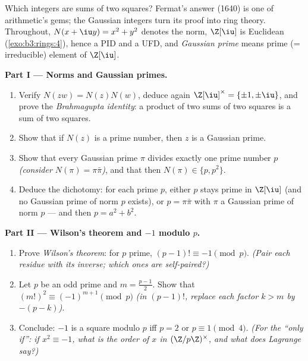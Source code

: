 \begin{problem}\label{pb:b3:rings:1}
Which integers are sums of two squares? Fermat's answer (1640) is
one of arithmetic's gems; the Gaussian integers turn its proof
into ring theory. Throughout, $N(x + \iu y) = x^2 + y^2$ denotes
the norm, $\Z[\iu]$ is Euclidean (\cref{exo:b3:rings:4}), hence a
PID and a UFD, and \emph{Gaussian prime} means prime (=
irreducible) element of $\Z[\iu]$.

\medskip
\noindent\textbf{Part I --- Norms and Gaussian primes.}
\begin{enumerate}
  \item Verify $N(zw) = N(z)N(w)$, deduce again $\Z[\iu]^\times =
        \{\pm1, \pm\iu\}$, and prove the \emph{Brahmagupta
        identity}: a product of two sums of two squares is a sum
        of two squares.
  \item Show that if $N(z)$ is a prime number, then $z$ is a
        Gaussian prime.
  \item Show that every Gaussian prime $\pi$ divides exactly one
        prime number $p$ \emph{(consider $N(\pi) = \pi\bar\pi$)},
        and that then $N(\pi) \in \{p, p^2\}$.
  \item Deduce the dichotomy: for each prime $p$, either $p$
        stays prime in $\Z[\iu]$ (and no Gaussian prime of norm
        $p$ exists), or $p = \pi\bar\pi$ with $\pi$ a Gaussian
        prime of norm $p$ --- and then $p = a^2 + b^2$.
\end{enumerate}

\medskip
\noindent\textbf{Part II --- Wilson's theorem and $-1$ modulo
$p$.}
\begin{enumerate}[resume]
  \item Prove \emph{Wilson's theorem}: for $p$ prime, $(p-1)!
        \equiv -1 \pmod p$. \emph{(Pair each residue with its
        inverse; which ones are self-paired?)}
  \item Let $p$ be an odd prime and $m = \frac{p-1}2$. Show that
        $(m!)^2 \equiv (-1)^{m+1} \pmod p$ \emph{(in $(p-1)!$,
        replace each factor $k > m$ by $-(p - k)$)}.
  \item Conclude: $-1$ is a square modulo $p$ iff $p = 2$ or $p
        \equiv 1 \pmod 4$. \emph{(For the ``only if'': if $x^2
        \equiv -1$, what is the order of $x$ in $(\Z/p\Z)^\times$,
        and what does Lagrange say?)}
\end{enumerate}


\end{problem}
